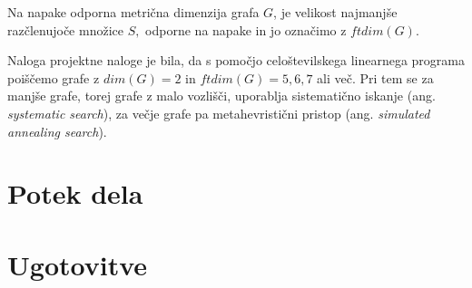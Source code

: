 \documentclass[12pt]{article}
\begin{document}
Na napake odporna metrična dimenzija grafa $G$, je velikost najmanjše razčlenujoče 
množice $S,$ odporne na napake in jo označimo z $ftdim(G).$
\vspace{0,5 cm}

Naloga projektne naloge je bila, da s pomočjo celoštevilskega linearnega programa 
poiščemo grafe z $dim(G) = 2$ in $ftdim(G) = 5, 6, 7$ ali več. Pri tem se za manjše
grafe, torej grafe z malo vozlišči, uporablja sistematično iskanje (ang.\textit{
systematic search}), za večje grafe pa metahevristični pristop (ang.\textit{ simulated 
annealing search}).

\section{Potek dela}


\section{Ugotovitve}
\end{document}
